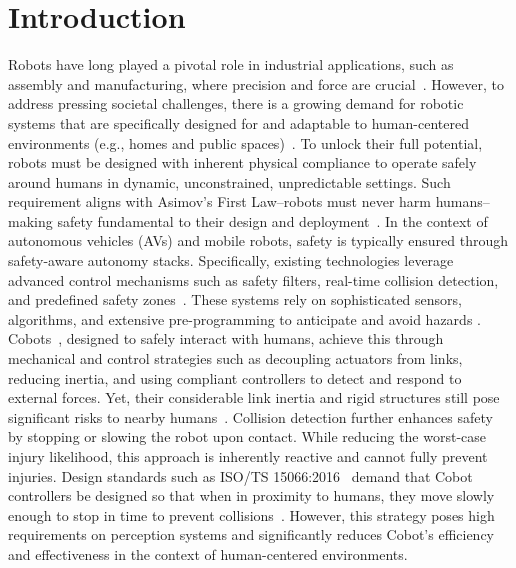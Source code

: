 \section{Introduction}
Robots have long played a pivotal role in industrial applications, such as assembly and manufacturing, where precision and force are crucial~\citep{todd1996fundamentals}.
However, to address pressing societal challenges, there is a growing demand for robotic systems that are specifically designed for and adaptable to human-centered environments (e.g., homes and public spaces)~\citep{nahavandi2019industry, chibani2013ubiquitous, royakkers2015literature}.
To unlock their full potential, robots must be designed with inherent physical compliance to operate safely around humans in dynamic, unconstrained, unpredictable settings.
Such requirement aligns with Asimov's First Law--robots must never harm humans--making safety fundamental to their design and deployment~\citep{villani2018survey}.
%
In the context of autonomous vehicles (AVs) and mobile robots, safety is typically ensured through safety-aware autonomy stacks. 
Specifically, existing technologies leverage advanced control mechanisms such as safety filters, real-time collision detection, and predefined safety zones~\citep{zhao2024potential}. 
These systems rely on sophisticated sensors, algorithms, and extensive pre-programming to anticipate and avoid hazards \citep{fragapane2021planning}. 
\glspl{Cobot}~\citep{el2019cobot}, designed to safely interact with humans, achieve this through mechanical and control strategies such as decoupling actuators from links, reducing inertia, and using compliant controllers to detect and respond to external forces. 
Yet, their considerable link inertia and rigid structures still pose significant risks to nearby humans~\citep{haddadin2013towards}.
Collision detection further enhances safety by stopping or slowing the robot upon contact. While reducing the worst-case injury likelihood, this approach is inherently reactive and cannot fully prevent injuries.
Design standards such as ISO/TS 15066:2016~\citep{Isots_15066_2016} demand that \gls{Cobot} controllers be designed so that when in proximity to humans, they move slowly enough to stop in time to prevent collisions~\citep{ajoudani2018progress, lucci2020combining}. 
However, this strategy poses high requirements on perception systems and significantly reduces \gls{Cobot}'s efficiency and effectiveness in the context of human-centered environments.

